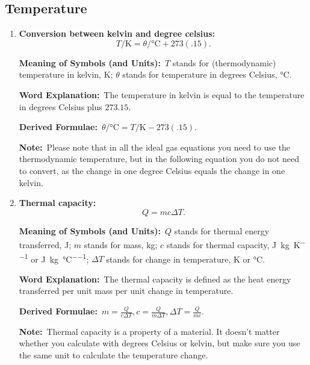 \documentclass[8pt]{article}
\newcommand{\MeanSymb}{\textbf{Meaning of Symbols (and Units):}\ }
\newcommand{\WordExpl}{\textbf{Word Explanation:}\ }
\newcommand{\DeriForm}{\textbf{Derived Formulae:}\ }
\newcommand{\Note}{\textbf{Note:}\ }
\begin{document}
        \subsection{Temperature}
            \begin{enumerate}
                \item \textbf{Conversion between kelvin and degree celsius:}
                \[
                    T \unit{\per \kelvin} = \theta \unit{\per \degreeCelsius} + 273(.15).
                \]

                \MeanSymb \(T\) stands for (thermodynamic) temperature in kelvin, \unit{\kelvin}; \(\theta\) stands for temperature in degrees Celsius, \unit{\degreeCelsius}.

                \WordExpl The temperature in kelvin is equal to the temperature in degrees Celsius plus \(273.15\).

                \DeriForm \(\theta \unit{\per \degreeCelsius} = T \unit{\per \kelvin} - 273(.15)\).

                \Note Please note that in all the ideal gas equations you need to use the thermodynamic temperature, but in the following equation you do not need to convert, as the change in one degree Celsius equals the change in one kelvin.

                \item \textbf{Thermal capacity:}
                \[
                    Q = m c \Delta T.
                \]

                \MeanSymb \(Q\) stands for thermal energy transferred, \unit{\joule}; \(m\) stands for mass, \unit{\kilogram}; \(c\) stands for thermal capacity, \unit{\joule \per \kilogram \per \kelvin} or \unit{\joule \per \kilogram \per \degreeCelsius}; \(\Delta T\) stands for change in temperature, \unit{\kelvin} or \unit{\degreeCelsius}.

                \WordExpl The thermal capacity is defined as the heat energy transferred per unit mass per unit change in temperature.

                \DeriForm \(m = \frac{Q}{c \Delta T}, c = \frac{Q}{m \Delta T}, \Delta T = \frac{Q}{mc}\).

                \Note Thermal capacity is a property of a material. It doesn't matter whether you calculate with degrees Celsius or kelvin, but make sure you use the same unit to calculate the temperature change.
                
            \end{enumerate}
\end{document}
